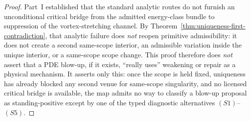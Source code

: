 \begin{proof}
Part~I established that the standard analytic routes do not furnish an unconditional critical bridge
from the admitted energy-class bundle to suppression of the vortex-stretching channel. By
Theorem~\ref{thm:uniqueness-first-contradiction}, that analytic failure does \emph{not} reopen primitive admissibility: it does not create a second same-scope interior, an admissible variation inside the unique interior, or a same-scope scope change. This proof therefore does \emph{not} assert that a PDE blow-up, if it exists, ``really uses'' weakening or repair as a physical mechanism. It asserts only this: once the scope is held fixed, uniqueness has already blocked any second venue for same-scope singularity, and no licensed critical bridge is available, the map admits no way to classify a blow-up proposal as standing-positive except by one of the typed diagnostic alternatives $(S1)$--$(S5)$.


\end{proof}
